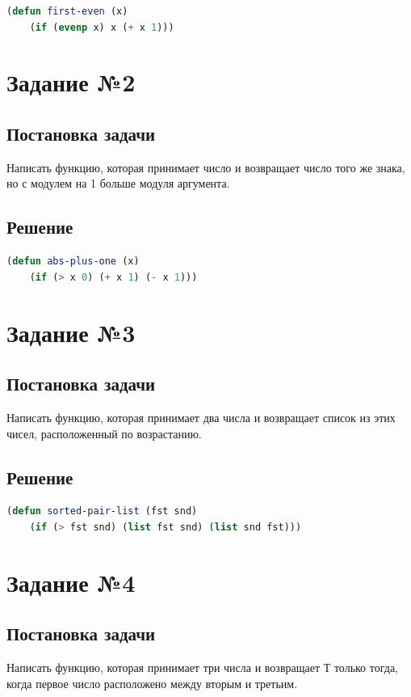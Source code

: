 \documentclass[12pt]{report}
\begin{document}
\begin{lstlisting}[label=first,caption=Решение задания №1, language=lisp]
(defun first-even (x)
	(if (evenp x) x (+ x 1)))
\end{lstlisting}

\section*{Задание №2}
\subsection*{Постановка задачи}
Написать функцию, которая принимает число и возвращает число того же знака, но с модулем на 1 больше модуля аргумента.

\subsection*{Решение}

\begin{lstlisting}[label=second,caption=Решение задания №2, language=lisp]
(defun abs-plus-one (x)
	(if (> x 0) (+ x 1) (- x 1)))
\end{lstlisting}

\section*{Задание №3}
\subsection*{Постановка задачи}
Написать функцию, которая принимает два числа и возвращает список из этих чисел, расположенный по возрастанию.

\subsection*{Решение}
\begin{lstlisting}[label=third,caption=Решение задания №3, language=lisp]
(defun sorted-pair-list (fst snd)
	(if (> fst snd) (list fst snd) (list snd fst)))
\end{lstlisting}

\section*{Задание №4}
\subsection*{Постановка задачи}
Написать функцию, которая принимает три числа и возвращает Т только тогда, когда первое число расположено между вторым и третьим.
\end{document}

